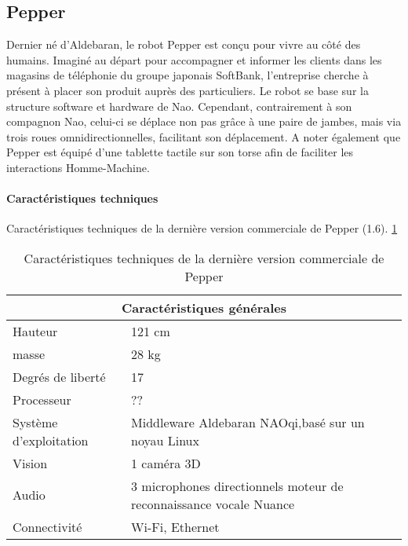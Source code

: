 \subsection{Pepper}
\label{Entreprise: Les produits: Pepper}
Dernier né d'Aldebaran, le robot Pepper est conçu pour vivre au côté des humains. Imaginé au départ pour accompagner et informer les clients dans les magasins de téléphonie du groupe japonais SoftBank, l'entreprise cherche à présent à placer son produit auprès des particuliers. Le robot se base sur la structure software et hardware de Nao. Cependant, contrairement à son compagnon Nao, celui-ci se déplace non pas grâce à une paire de jambes, mais via trois roues omnidirectionnelles, facilitant son déplacement. A noter également que Pepper est équipé d'une tablette tactile sur son torse afin de faciliter les interactions Homme-Machine.

\paragraph{Caractéristiques techniques}
Caractéristiques techniques de la dernière version commerciale de Pepper (1.6). \ref{tab: Caractéristiques technique de Pepper}

\begin{table}[h]
\begin{tabular}{ | l | p{7cm} | }
	\hline
	\multicolumn{2}{|c|}{Caractéristiques générales} \\
	\hline
	Hauteur & 121 cm \\
	\hline 
	masse & 28 kg \\
	\hline 
	Degrés de liberté  & 17 \\
	\hline
	Processeur & ?? \\
	\hline
	Système d'exploitation & Middleware Aldebaran NAOqi,\newline basé sur un noyau Linux \\
	\hline 
	Vision & 1 caméra 3D \\
	\hline
	Audio & 3 microphones directionnels \newline moteur de reconnaissance vocale Nuance  \\
	\hline
	Connectivité & Wi-Fi, Ethernet \\
	\hline
\end{tabular}
\caption[Caractéristiques technique de Pepper]{Caractéristiques techniques de la dernière version commerciale  de Pepper}
\label {tab: Caractéristiques technique de Pepper}
\end{table}

